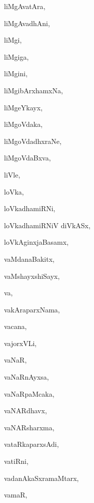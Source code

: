 \begin{multicols}{3}
{\noindent
{liMgAvatAra}, \pageref{liMgAvatAra}

\noindent
{liMgAvadhAni}, \pageref{liMgAvadhAni}

\noindent
{liMgi}, \pageref{liMgi}

\noindent
{liMgiga}, \pageref{liMgiga}

\noindent
{liMgini}, \pageref{liMgini}

\noindent
{liMgibArxhamxNa}, \pageref{liMgibArxhamxNa}

\noindent
{liMgeYkayx}, \pageref{liMgeYkayx}

\noindent
{liMgoVdaka}, \pageref{liMgoVdaka}

\noindent
{liMgoVdadhxraNe}, \pageref{liMgoVdadhxraNe}

\noindent
{liMgoVdaBxva}, \pageref{liMgoVdaBxva}

\noindent
{liVle}, \pageref{liVle}

\noindent
{loVka}, \pageref{loVka}

\noindent
{loVkadhamiRNi}, \pageref{loVkadhamiRNi}

\noindent
{loVkadhamiRNiV diVkASx}, \pageref{loVkadhamiRNiVdiVkASx}

\noindent
{loVkAginxjaBasamx}, \pageref{loVkAginxjaBasamx}

\noindent
{vaMdanaBakitx}, \pageref{vaMdanaBakitx}

\noindent
{vaMshayxshiSayx}, \pageref{vaMshayxshiSayx}

\noindent
{va}, \pageref{va}

\noindent
{vakAraparxNama}, \pageref{vakAraparxNama}

\noindent
{vacana}, \pageref{vacana}

\noindent
{vajorxVLi}, \pageref{vajorxVLi}

\noindent
{vaNaR}, \pageref{vaNaR}

\noindent
{vaNaRnAyxsa}, \pageref{vaNaRnAyxsa}

\noindent
{vaNaRpaMcaka}, \pageref{vaNaRpaMcaka}

\noindent
{vaNARdhavx}, \pageref{vaNARdhavx}

\noindent
{vaNARsharxma}, \pageref{vaNARsharxma}

\noindent
{vataRkaparxsAdi}, \pageref{vataRkaparxsAdi}

\noindent
{vatiRni}, \pageref{vatiRni}

\noindent
{vadanAkaSxramaMtarx}, \pageref{vadanAkaSxramaMtarx}

\noindent
{vamaR}, \pageref{vamaR}

}
\end{multicols}
